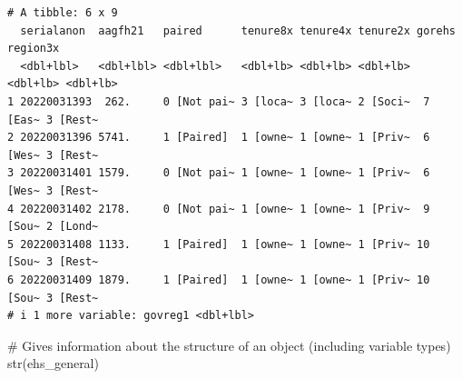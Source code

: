 \documentclass[
  letterpaper,
  DIV=11,
  numbers=noendperiod]{scrreprt}
\newenvironment{Shaded}{\begin{snugshade}}{\end{snugshade}}
\newcommand{\CommentTok}[1]{\textcolor[rgb]{0.37,0.37,0.37}{#1}}
\newcommand{\FunctionTok}[1]{\textcolor[rgb]{0.28,0.35,0.67}{#1}}
\newcommand{\NormalTok}[1]{\textcolor[rgb]{0.00,0.23,0.31}{#1}}
\begin{document}
\begin{verbatim}
# A tibble: 6 x 9
  serialanon  aagfh21   paired      tenure8x tenure4x tenure2x gorehs   region3x
  <dbl+lbl>   <dbl+lbl> <dbl+lbl>   <dbl+lb> <dbl+lb> <dbl+lb> <dbl+lb> <dbl+lb>
1 20220031393  262.     0 [Not pai~ 3 [loca~ 3 [loca~ 2 [Soci~  7 [Eas~ 3 [Rest~
2 20220031396 5741.     1 [Paired]  1 [owne~ 1 [owne~ 1 [Priv~  6 [Wes~ 3 [Rest~
3 20220031401 1579.     0 [Not pai~ 1 [owne~ 1 [owne~ 1 [Priv~  6 [Wes~ 3 [Rest~
4 20220031402 2178.     0 [Not pai~ 1 [owne~ 1 [owne~ 1 [Priv~  9 [Sou~ 2 [Lond~
5 20220031408 1133.     1 [Paired]  1 [owne~ 1 [owne~ 1 [Priv~ 10 [Sou~ 3 [Rest~
6 20220031409 1879.     1 [Paired]  1 [owne~ 1 [owne~ 1 [Priv~ 10 [Sou~ 3 [Rest~
# i 1 more variable: govreg1 <dbl+lbl>
\end{verbatim}

\begin{Shaded}
\begin{Highlighting}[]
\CommentTok{\# Gives information about the structure of an object (including variable types)}
\FunctionTok{str}\NormalTok{(ehs\_general)}
\end{Highlighting}
\end{Shaded}
\end{document}
